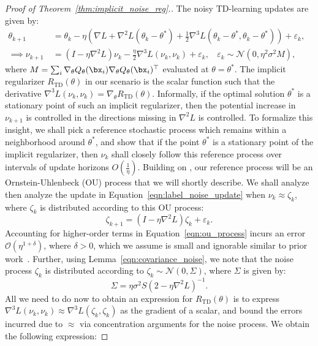 \begin{proof}[Proof of Theorem~\ref{thm:implicit_noise_reg}.]
The noisy TD-learning updates are given by:
\begin{align}
    \theta_{k+1} ~&= \theta_k - \eta \left( \nabla L + \nabla^2 L (\theta_k - \theta^*) + \frac{1}{2} \nabla^3 L (\theta_k - \theta^*, \theta_k - \theta^*) \right) + \varepsilon_k, ~~~~~~\\
    \label{eqn:label_noise_update}
    \implies \nu_{k+1} ~&= (I - \eta \nabla^2 L )\nu_k  - \frac{\eta}{2} \nabla^3 L (\nu_k, \nu_k) + \varepsilon_k, ~~~~ \varepsilon_k \sim \mathcal{N}(0, \eta^2 \sigma^2 M),
\end{align}
where $M = \sum_i \nabla_\theta Q_\theta(\bx_i) \nabla_\theta Q_\theta(\bx_i)^\top$ evaluated at $\theta = \theta^*$. The implicit regularizer $R_\mathrm{TD}(\theta)$ in our scenario is the scalar function such that the derivative $\nabla^3 L(\nu_k, \nu_k) = \nabla_\theta R_\mathrm{TD}(\theta)$. Informally, if the optimal solution $\theta^*$ is a stationary point of such an implicit regularizer, then the potential increase in $\nu_{k+1}$ is controlled in the directions missing in $\nabla^2 L$ is controlled. To formalize this insight, we shall pick a reference stochastic process which remains within a neighborhood around $\theta^*$, and show that if the point $\theta^*$ is a stationary point of the implicit regularizer, then $\nu_k$ shall closely follow this reference process over intervals of update horizons $O(\frac{1}{\eta})$. Building on \citet{blanc2020implicit}, our reference process will be an Ornstein-Uhlenbeck (OU) process that we will shortly describe. We shall analyze then analyze the update in Equation~\ref{eqn:label_noise_update} when $\nu_k \approx \zeta_k$, where $\zeta_k$ is distributed according to this OU process:
\begin{equation}
    \label{eqn:ou_process}
    \zeta_{k+1} = (I - \eta \nabla^2 L) \zeta_k + \varepsilon_k.
\end{equation}
Accounting for higher-order terms in Equation~\ref{eqn:ou_process} incurs an error $\mathcal{O}(\eta^{1 + \delta})$, where $\delta > 0$, which we assume is small and ignorable similar to prior work~\citep{blanc2020implicit}. Further, using Lemma~\ref{eqn:covariance_noise}, we note that the noise process $\zeta_k$ is distributed according to $\zeta_k \sim \mathcal{N}(0, \Sigma)$, where $\Sigma$ is given by:
\begin{equation}
    \Sigma = \eta \sigma^2 S (2 - \eta \nabla^2 L)^{-1}.
\end{equation}
All we need to do now to obtain an expression for $R_\mathrm{TD}(\theta)$ is to express $\nabla^3 L(\nu_k, \nu_k) \approx \nabla^3 L (\zeta_k, \zeta_k)$ as the gradient of a scalar, and bound the errors incurred due to $\approx$ via concentration arguments for the noise process. We obtain the following expression:

\end{proof}
